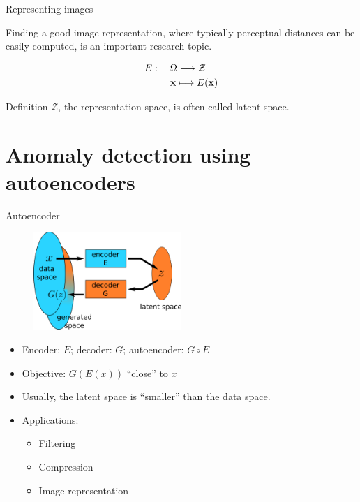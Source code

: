 \documentclass[xcolor=pdftex,dvipsnames,table,mathserif]{beamer}
\begin{document}
\begin{frame}{Representing images}

\begin{block}{}
  Finding a good image representation, where typically perceptual distances can be easily computed, is an important research topic.
\end{block}

    \[
    \begin{split}
    E: & ~~~~\Omega \longrightarrow \mathcal{Z} \\
    & ~~~~ \mathbf{x} \longmapsto E(\mathbf{x})
    \end{split}
    \]

\begin{block}{Definition}
$\mathcal{Z}$, the representation space, is often called \alert{latent} space.
\end{block}

\end{frame}



\section{Anomaly detection using autoencoders}


\begin{frame}{Autoencoder}

  \begin{figure}[ht]
    \centering
    \includegraphics[width=0.5\textwidth]{ae.png}
  \end{figure}

  \begin{itemize}
  \item Encoder: $E$; decoder: $G$; autoencoder: $G \circ E$
  \item Objective: $G(E(x))$ ``close'' to $x$
  \item Usually, the latent space is ``smaller'' than the data space.
  \item Applications:
   \begin{itemize}
   \item Filtering
   \item Compression
   \item Image representation
   \end{itemize}
  \end{itemize}

\end{frame}
\end{document}
